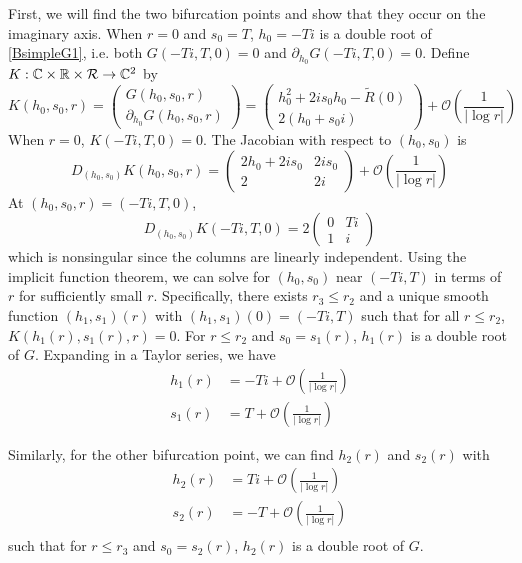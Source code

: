 \documentclass[thesis.tex]{subfiles}
\begin{document}
First, we will find the two bifurcation points and show that they occur on the imaginary axis. When $r = 0$ and $s_0 = T$, $h_0 = -T i$ is a double root of \cref{BsimpleG1}, i.e. both $G(-T i, T, 0) = 0$ and $\partial_{h_0} G(-Ti, T, 0) = 0$. Define $K: \mathbb{C} \times \mathbb{R} \times \mathcal{R} \rightarrow \mathbb{C}^2$ by
\begin{equation}
K(h_0, s_0, r) = 
\begin{pmatrix}G(h_0, s_0, r) \\ \partial_{h_0}G(h_0, s_0, r) \end{pmatrix} 
= \begin{pmatrix}
h_0^2 + 2 i s_0 h_0 - \tilde{R}(0) \\
2(h_0 + s_0 i) 
\end{pmatrix}
+ \mathcal{O}\left( \frac{1}{|\log r|} \right)
\end{equation}
When $r = 0$, $K\left(-Ti, T, 0\right) = 0$. The Jacobian with respect to $(h_0, s_0)$ is
\[
D_{(h_0, s_0)}K(h_0, s_0, r) = 
\begin{pmatrix}
2 h_0 + 2 i s_0 & 2 i s_0  \\
2 & 2 i
\end{pmatrix}
+ \mathcal{O}\left( \frac{1}{|\log r|} \right)
\]
At $(h_0, s_0, r) = \left( -Ti, T,0\right)$, 
\[
D_{(h_0, s_0)}K\left( -Ti, T,0\right) = 
2 \begin{pmatrix}
0 & Ti \\
1 & i
\end{pmatrix}
\]
which is nonsingular since the columns are linearly independent. Using the implicit function theorem, we can solve for $(h_0, s_0)$ near $(-Ti, T)$ in terms of $r$ for sufficiently small $r$. Specifically, there exists $r_3 \leq r_2$ and a unique smooth function $(h_1, s_1)(r)$ with $(h_1, s_1)(0) = (-Ti, T)$ such that for all $r \leq r_2$, $K(h_1(r), s_1(r), r) = 0$. For $r \leq r_2$ and $s_0 = s_1(r)$, $h_1(r)$ is a double root of $G$. Expanding in a Taylor series, we have
\begin{align*}
h_1(r) &= -T i + \mathcal{O}\left( \frac{1}{|\log r|} \right) \\
s_1(r) &= T + \mathcal{O}\left( \frac{1}{|\log r|} \right)
\end{align*}

Similarly, for the other bifurcation point, we can find $h_2(r)$ and $s_2(r)$ with
\begin{align*}
h_2(r) &= T i + \mathcal{O}\left( \frac{1}{|\log r|} \right) \\
s_2(r) &= -T + \mathcal{O}\left( \frac{1}{|\log r|} \right) \\
\end{align*}
such that for $r \leq r_3$ and $s_0 = s_2(r)$, $h_2(r)$ is a double root of $G$.
\end{document}
